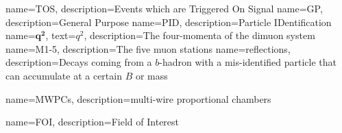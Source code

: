 {
	name=TOS,
		description={Events which are Triggered On Signal}
}                                    
{
	name=GP,
		description={General Purpose}                                 }                  
{
	name=PID,
		description={Particle IDentification} 
}                 
{
	name=$\mathbold{q^{2}}$,
		text=$q^{2}$,
		description={The four-momenta of the dimuon system}
}
{
	name=M1-5,
		description={The five muon stations}
}
{
	name=reflections,
		description={Decays coming from a $b$-hadron with a mis-identified particle that can accumulate at a certain $B$ or \Lb mass}
}

{
	name=MWPCs,
		description={multi-wire proportional chambers}
}


{
	name=FOI,
		description={Field of Interest}
}


